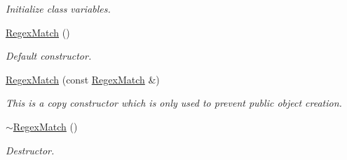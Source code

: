 \begin{DoxyCompactItemize}
\begin{DoxyCompactList}\small\item\em Initialize class variables. \end{DoxyCompactList}\item 
\hyperlink{classjpcre2_1_1RegexMatch_a40127e5057e2343848d8c8a6d4c32bcd}{Regex\+Match} ()
\begin{DoxyCompactList}\small\item\em Default constructor. \end{DoxyCompactList}\item 
\hyperlink{classjpcre2_1_1RegexMatch_a098ddb46b2f297870ea548ef07597d94}{Regex\+Match} (const \hyperlink{classjpcre2_1_1RegexMatch}{Regex\+Match} \&)
\begin{DoxyCompactList}\small\item\em This is a copy constructor which is only used to prevent public object creation. \end{DoxyCompactList}\item 
\hyperlink{classjpcre2_1_1RegexMatch_ab6a9f9b8404852e46edd08a5b8712847}{$\sim$\+Regex\+Match} ()
\begin{DoxyCompactList}\small\item\em Destructor. \end{DoxyCompactList}\end{DoxyCompactItemize}
